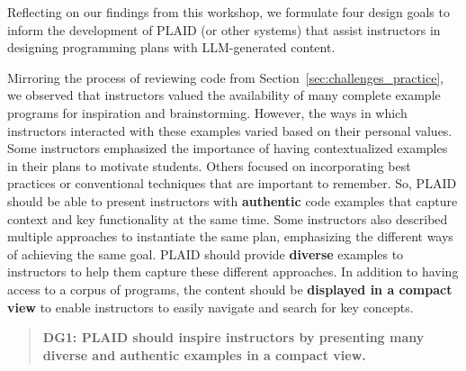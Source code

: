 Reflecting on our findings from this workshop, we formulate four design goals to inform the development of PLAID (or other systems) that assist instructors in designing programming plans with LLM-generated content.

Mirroring the process of reviewing code from Section~\ref{sec:challenges_practice}, we observed that instructors valued the availability of many complete example programs for inspiration and brainstorming.
However, the ways in which instructors interacted with these examples varied based on their personal values. %
Some instructors emphasized the importance of having contextualized examples in their plans to motivate students. 
Others focused on incorporating best practices or conventional techniques that 
are important to remember. 
So, PLAID should be able to present instructors with \textbf{authentic} code examples that capture context and key functionality at the same time.
Some instructors also described multiple approaches to instantiate the same plan, emphasizing the different ways of achieving the same goal. 
PLAID should provide \textbf{diverse} examples to instructors to help them capture these different approaches.
In addition to having access to a corpus of programs, the content should be \textbf{displayed in a compact view} to enable instructors to easily navigate and search for key concepts.

\begin{quote}
    \textbf{DG1: PLAID should inspire instructors by presenting many diverse and authentic examples in a compact view.}
\end{quote}

